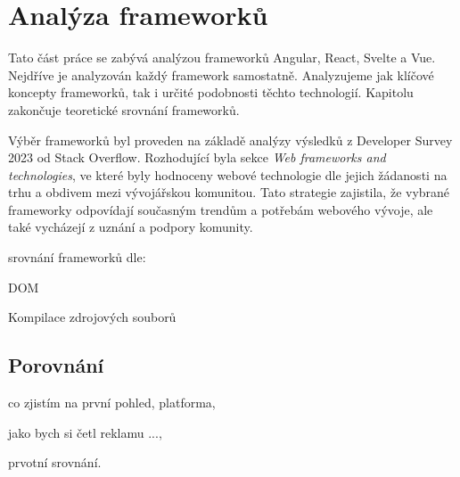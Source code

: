 \section{Analýza frameworků}

Tato část práce se zabývá analýzou frameworků Angular, React, Svelte a Vue. Nejdříve je analyzován každý framework samostatně. 
Analyzujeme jak klíčové koncepty frameworků, tak i určité podobnosti těchto technologií. Kapitolu zakončuje teoretické srovnání frameworků.

Výběr frameworků byl proveden na základě analýzy výsledků z Developer Survey 2023 od Stack Overflow. 
Rozhodující byla sekce \textit{Web frameworks and technologies}, ve které byly hodnoceny webové technologie dle jejich žádanosti na trhu a obdivem mezi vývojářskou komunitou. 
Tato strategie zajistila, že vybrané frameworky odpovídají současným trendům a potřebám webového vývoje, ale také vycházejí z uznání a podpory komunity.\cite{stackoverflow, developersurvey}

\begin{citemize}
	\item srovnání frameworků dle:
	\begin{cenumerate}
		\item DOM %
		\item Kompilace zdrojových souborů %
	\end{cenumerate}
\end{citemize}







\subsection{Porovnání}

\begin{citemize}
	\item co zjistím na první pohled, platforma,
	\item jako bych si četl reklamu ...,
	\item prvotní srovnání.
\end{citemize}
